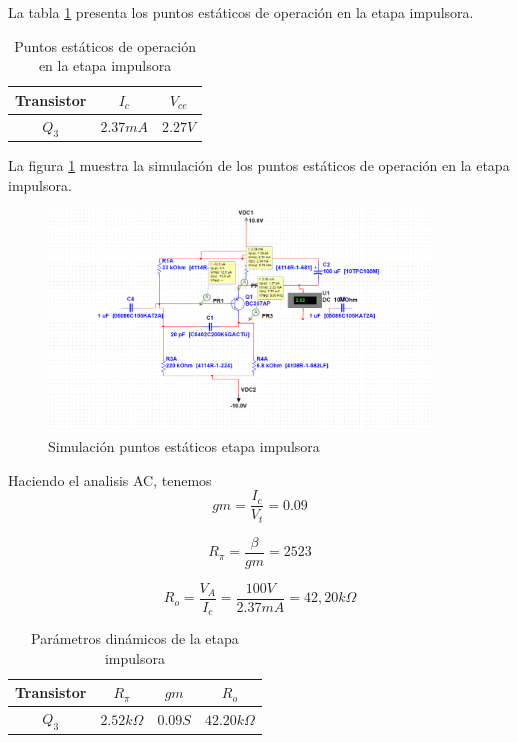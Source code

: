 La tabla \ref{tab:etapa-impulsora-puntos-estaticos} presenta los puntos estáticos de operación en la etapa impulsora.

\begin{table}[ht]
    \centering
    \begin{tabular}{|c|c|c|}
        \hline
        Transistor & \textbf{$I_c$} & \textbf{$V_{ce}$} \\
        \hline
        $Q_3$ & $2.37 mA$ & $2.27 V$ \\
        \hline
    \end{tabular}
    \caption{Puntos estáticos de operación en la etapa impulsora}
    \label{tab:etapa-impulsora-puntos-estaticos}
\end{table}

La figura \ref{fig:sim-etapa-impulsora-puntos-estaticos} muestra la simulación de los puntos estáticos de operación en la etapa impulsora.

\begin{figure}[ht]
    \centering
    \includegraphics[width=0.9\textwidth]{src/images/p3/ punto-estatico-etapa-impulsora.png}
    \caption{Simulación puntos estáticos etapa impulsora}
    \label{fig:sim-etapa-impulsora-puntos-estaticos}
\end{figure}

Haciendo el analisis AC, tenemos 
$$gm = \frac{I_{c}}{V_t} = 0.09$$

$$R_{\pi} = \frac{\beta}{gm} = 2523$$

$$R_o = \frac{V_A}{I_c} = \frac{100V}{2.37mA} = 42,20k\Omega$$

\begin{table}[ht]
    \centering
    \begin{tabular}{|c|c|c|c|}
        \hline
        Transistor & $R_\pi$ & $gm$ & $R_o$ \\
        \hline
        $Q_3$ & $2.52 k\Omega$ & $0.09S$ & $42.20k\Omega$ \\
        \hline
    \end{tabular}
    \caption{Parámetros dinámicos de la etapa impulsora}
    \label{tab:met-etapa-impulsora-parametros-dinamicos}
\end{table}


